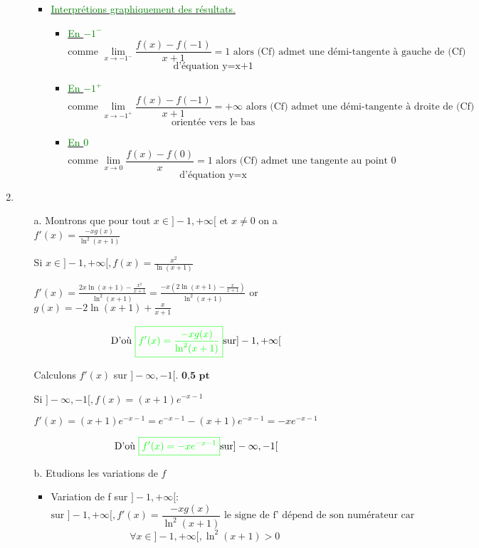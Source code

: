 \documentclass[12pt]{article}
\begin{document}
\begin{enumerate}
\begin{enumerate}
\begin{itemize}
\item \underline{\textcolor{green}{Interprétions graphiquement des résultats.}}

\begin{itemize}
\item \underline{\textcolor{green}{En $-1^{-}$}}
\[\text{comme } \lim_{x \to -1^{-}} \frac{f(x)-f(-1)}{x+1}=1 \text{ alors (Cf) admet une démi-tangente à gauche de (Cf)} \]
\[\text{d'équation y=x+1} \]
\item \underline{\textcolor{green}{En $-1^{+}$}}
\[\text{comme } \lim_{x \to -1^{+}} \frac{f(x)-f(-1)}{x+1}=+\infty \text{ alors (Cf) admet une démi-tangente à droite de (Cf)} \]
\[\text{orientée vers le bas} \]
\item \underline{\textcolor{green}{En $0$}}
\[\text{comme } \lim_{x \to 0} \frac{f(x)-f(0)}{x}=1 \text{ alors (Cf) admet une tangente au point 0 } \]
\[\text{d'équation y=x} \]
\end{itemize}

\end{itemize}
\end{enumerate}
\item
\begin{enumerate}
\item[a.] Montrons que pour tout $x \in ]-1, +\infty[$ et $x\neq 0$ on a $f'(x)=\frac{-xg(x)}{\ln^{2}(x+1)}$

Si $x \in ]-1, +\infty[, f(x)=\frac{x^{2}}{\ln(x+1)}$

$f'(x)=\frac{2x\ln(x+1)-\frac{x^{2}}{x+1}}{\ln^{2}(x+1)}=\frac{-x\left( 2\ln(x+1)-\frac{x}{x+1}\right) }{\ln^{2}(x+1)}$ or $g(x)=-2\ln(x+1)+\frac{x}{x+1}$

\[\text{D'où  }\textcolor{green}{ \boxed{ f'(x)=\frac{-xg(x)}{\ln^{2}(x+1)} } } \text{sur} ]-1, +\infty[\]

Calculons $f'(x)$ sur $]-\infty, -1[$. $\textbf{0,5 pt}$

Si $]-\infty, -1[, f(x)=(x+1)e^{-x-1}$

$ f'(x)=(x+1)e^{-x-1}=e^{-x-1}-(x+1)e^{-x-1}=-xe^{-x-1} $

\[\text{D'où  }\textcolor{green}{ \boxed{ f'(x)=-xe^{-x-1} } }\text{sur} ]-\infty, -1[\]

\item[b.] Etudions les variations de $f$ 
\begin{itemize}
\item Variation de f sur $]-1, +\infty[$:
\[\text{sur } ]-1, +\infty[,f'(x)=\frac{-xg(x)}{\ln^{2}(x+1)} \text{ le signe de f' dépend de son numérateur car } \]
\[\forall x \in ]-1, +\infty[, \ln^{2}(x+1)>0\]


\end{itemize}
\end{enumerate}
\end{enumerate}
\end{document}
